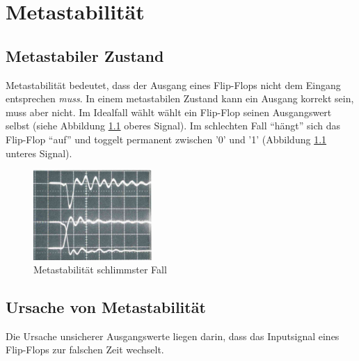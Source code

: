 
\chapter{Metastabilität}\label{chap.metastabilitat}

\section{Metastabiler Zustand}\label{sect.meatastabil_def}
Metastabilität bedeutet, dass der Ausgang eines Flip-Flops nicht dem Eingang entsprechen \textit{muss}. In einem metastabilen Zustand kann ein Ausgang korrekt sein, muss aber nicht.
Im Idealfall wählt wählt ein Flip-Flop seinen Ausgangswert selbst (siehe Abbildung \ref{fig.metastabil.schlimmster_Fall} oberes Signal). Im schlechten Fall “hängt” sich das Flip-Flop “auf” und toggelt permanent zwischen '0' und '1' (Abbildung \ref{fig.metastabil.schlimmster_Fall} unteres Signal).

\begin{figure}[H]
	\includegraphics[width=0.4\textwidth]{images/metastability/metastability_2_IO.png}
	\caption{Metastabilität schlimmster Fall \citep{F_metastability}}
	\label{fig.metastabil.schlimmster_Fall}
\end{figure}


\section{Ursache von Metastabilität}\label{sect.meatastabil_ursache}

Die Ursache unsicherer Ausgangswerte liegen darin, dass das Inputsignal eines Flip-Flops zur falschen Zeit wechselt.

